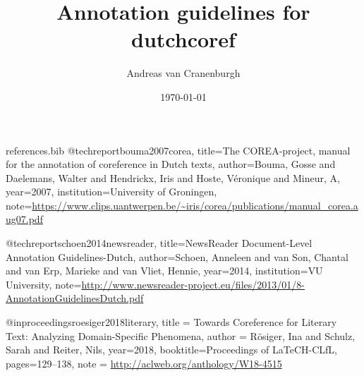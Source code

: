 \RequirePackage{filecontents}
\begin{filecontents}{references.bib}
@techreport{bouma2007corea,
  title={The COREA-project, manual for the annotation of coreference in Dutch texts},
  author={Bouma, Gosse and Daelemans, Walter and Hendrickx, Iris and Hoste, V{\'e}ronique and Mineur, A},
  year={2007},
  institution={University of Groningen},
  note={\url{https://www.clips.uantwerpen.be/~iris/corea/publications/manual_corea.aug07.pdf}}
}

@techreport{schoen2014newsreader,
  title={NewsReader Document-Level Annotation Guidelines-Dutch},
  author={Schoen, Anneleen and van Son, Chantal and van Erp, Marieke and van Vliet, Hennie},
  year={2014},
  institution={VU University},
  note={\url{http://www.newsreader-project.eu/files/2013/01/8-AnnotationGuidelinesDutch.pdf}}
}

@inproceedings{roesiger2018literary,
    title = {Towards Coreference for Literary Text: Analyzing Domain-Specific Phenomena},
    author = {R\"osiger, Ina  and Schulz, Sarah  and Reiter, Nils},
    year={2018},
    booktitle={Proceedings of LaTeCH-CLfL},
    pages={129--138},
    note = {\url{http://aclweb.org/anthology/W18-4515}}
}
\end{filecontents}
\documentclass[a4paper]{article}
\usepackage[T1]{fontenc}
\usepackage[utf8]{inputenc}
\usepackage{kpfonts, mdwlist, microtype, xcolor, natbib}
\usepackage[unicode=true]{hyperref}
\setlength{\emergencystretch}{3em}  %
\newcommand{\n}[1]{\textcolor{red}{#1}}

\title{Annotation guidelines for dutchcoref}
\author{Andreas van Cranenburgh}
\date{\today}


\maketitle

\section{How to annotate?}

\begin{itemize*}
\item Read the text from start to finish, make and correct annotations as
  you go.
\item Identify mentions by asking yourself whether a span of text describes
  a specific identifiable object or person.
\item When the same entity is referred to again, ensure that both mentions
  are in the same coreference cluster. Conversely, remove any
  incorrect links.
\end{itemize*}

